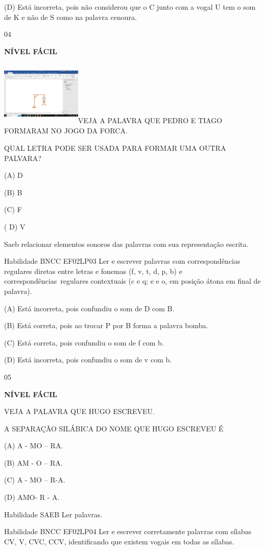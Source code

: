 {{(D) Está incorreta, pois não considerou que o C junto com a vogal U tem
o som de K e não de S como na palavra cenoura.

\num{04}

\textbf{NÍVEL FÁCIL}

\includegraphics[width=1.50909in,height=1.22355in]{media/image150.png}VEJA
A PALAVRA QUE PEDRO E TIAGO FORMARAM NO JOGO DA FORCA.

\protect\hypertarget{_Hlk129505254}{}{}QUAL LETRA PODE SER USADA PARA
FORMAR UMA OUTRA PALVARA?

(A) D

(B) B

(C) F

( D) V

Saeb relacionar elementos sonoros das palavras com sua representação
escrita.

Habilidade BNCC EF02LP03 Ler e escrever palavras com correspondências
regulares diretas entre letras e fonemas (f, v, t, d, p, b) e
correspondências~regulares contextuais (c e q; e e o, em posição átona
em final de palavra).

(A) Está incorreta, pois confundiu o som de D com B.

(B) Está correta, pois ao trocar P por B forma a palavra bomba.

(C) Está correta, pois confundiu o som de f com b.

(D) Está incorreta, pois confundiu o som de v com b.

\num{05}

\textbf{NÍVEL FÁCIL}

VEJA A PALAVRA QUE HUGO ESCREVEU.

A SEPARAÇÃO SILÁBICA DO NOME QUE HUGO ESCREVEU É

(A) A - MO -- RA.

(B) AM - O -- RA.

(C) A - MO -- R-A.

(D) AMO- R - A.

\protect\hypertarget{_Hlk129375756}{}{}Habilidade SAEB Ler palavras.

Habilidade BNCC EF02LP04 Ler e escrever corretamente palavras com
sílabas CV, V, CVC, CCV, identificando que existem vogais em todas as
sílabas.

}}
